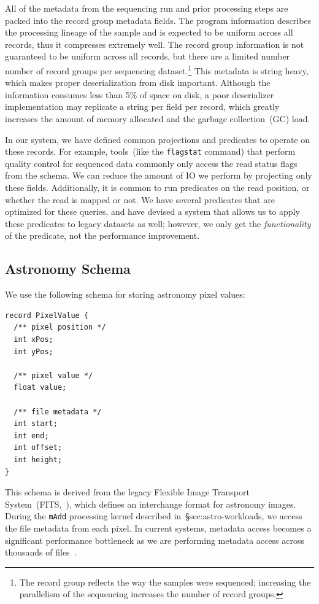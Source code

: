 \documentclass{acm_proc_article-sp}
\begin{document}
All of the metadata from the sequencing run and prior processing steps are packed into the record
group metadata fields. The program information describes the processing lineage of the sample and
is expected to be uniform across all records, thus it compresses extremely well. The record group
information is not guaranteed to be uniform across all records, but there are a limited number number
of record groups per sequencing dataset.\footnote{The record group reflects the way the samples were
sequenced; increasing the parallelism of the sequencing increases the number of record groups.} This
metadata is string heavy, which makes proper deserialization from disk important. Although the
information consumes less than 5\% of space on disk, a poor deserializer implementation may replicate
a string per field per record, which greatly increases the amount of memory allocated and the garbage
collection~(GC) load.

In our system, we have defined common projections and predicates to operate on these records. For
example, tools~(like the \texttt{flagstat} command) that perform quality control for sequenced data
commonly only access the read status flags from the schema. We can reduce the amount of IO we
perform by projecting only these fields. Additionally, it is common to run predicates on the read position,
or whether the read is mapped or not. We have several predicates that are optimized for these queries,
and have devised a system that allows us to apply these predicates to legacy datasets as well; however,
we only get the \emph{functionality} of the predicate, not the performance improvement.

\subsection{Astronomy Schema}
\label{sec:astronomy-schema}

We use the following schema for storing astronomy pixel values:

\begin{lstlisting}
record PixelValue {
  /** pixel position */
  int xPos;
  int yPos;
  
  /** pixel value */
  float value;
  
  /** file metadata */
  int start;
  int end;
  int offset;
  int height;
}
\end{lstlisting}

This schema is derived from the legacy Flexible Image Transport System~(FITS,~\cite{wells81}), which
defines an interchange format for astronomy images. During the \texttt{mAdd} processing kernel
described in~\S{sec:astro-workloads}, we access the file metadata from each pixel. In current systems,
metadata access becomes a significant performance bottleneck as we are performing metadata access
across thousands of files~\cite{zhang13}.
\end{document}
